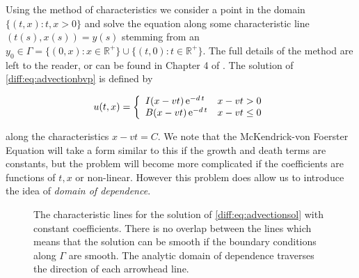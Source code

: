 \documentclass[../main.tex]{subfiles}
\begin{document}
  Using the method of characteristics we consider a point in the domain $\{(t, x) : t, x > 0 \}$ and solve the equation along some characteristic line $(t(s), x(s)) = y(s)$ stemming from an $y_0 \in \Gamma = \{ (0, x) : x \in \mathbb{R}^+ \} \cup \{ (t, 0) : t \in \mathbb{R}^+ \}$. The full details of the method are left to the reader, or can be found in Chapter 4 of \cite{holmes2006}.  The solution of \autoref{diff:eq:advectionbvp} is defined by

  \begin{equation} \label{diff:eq:advectionsol}
    u(t, x) = \left\lbrace \begin{array}{ll}
      I(x - v t) \operatorname{e}^{-d \, t} & x - vt > 0 \\
      B(x - v t) \operatorname{e}^{-d \, t} & x - vt \leq 0 \\
  \end{array} \right.
  \end{equation}

  along the characteristics $x - vt = C$. We note that the McKendrick-von Foerster Equation will take a form similar to this if the growth and death terms are constants, but the problem will become more complicated if the coefficients are functions of $t, x$ or non-linear. However this problem does allow us to introduce the idea of \emph{domain of dependence}.

  \begin{figure}[htb]
    \centering

    \caption{The characteristic lines for the solution of \autoref{diff:eq:advectionsol} with constant coefficients. There is no overlap between the lines which means that the solution can be smooth if the boundary conditions along $\Gamma$ are smooth. The analytic domain of dependence traverses the direction of each arrowhead line. \label{diff:fig:domainofdep}}
  \end{figure}
\end{document}
